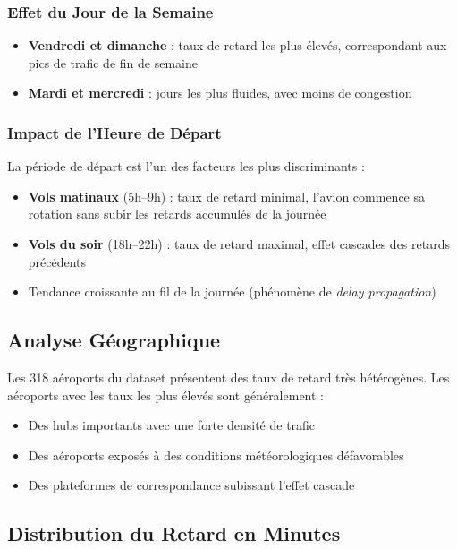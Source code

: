 \documentclass[12pt,a4paper]{article}
\begin{document}
\subsubsection{Effet du Jour de la Semaine}

\begin{itemize}[leftmargin=*]
  \item \textbf{Vendredi et dimanche} : taux de retard les plus élevés, correspondant 
        aux pics de trafic de fin de semaine
  \item \textbf{Mardi et mercredi} : jours les plus fluides, avec moins de congestion
\end{itemize}

\subsubsection{Impact de l'Heure de Départ}

La période de départ est l'un des facteurs les plus discriminants :
\begin{itemize}[leftmargin=*]
  \item \textbf{Vols matinaux} (5h--9h) : taux de retard minimal, l'avion commence 
        sa rotation sans subir les retards accumulés de la journée
  \item \textbf{Vols du soir} (18h--22h) : taux de retard maximal, effet cascades 
        des retards précédents
  \item Tendance croissante au fil de la journée (phénomène de \textit{delay propagation})
\end{itemize}

\subsection{Analyse Géographique}

Les 318 aéroports du dataset présentent des taux de retard très hétérogènes.
Les aéroports avec les taux les plus élevés sont généralement :
\begin{itemize}[leftmargin=*]
  \item Des hubs importants avec une forte densité de trafic
  \item Des aéroports exposés à des conditions météorologiques défavorables
  \item Des plateformes de correspondance subissant l'effet cascade
\end{itemize}

\subsection{Distribution du Retard en Minutes}
\end{document}
